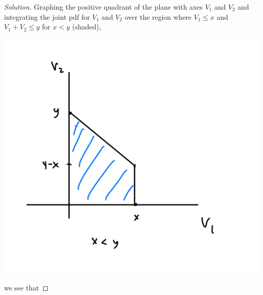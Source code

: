 \documentclass[11pt]{article}
\newenvironment{solution}
  {\renewcommand\qedsymbol{$\blacksquare$}\begin{proof}[Solution]}
  {\end{proof}}
\begin{document}
\begin{enumerate}
\begin{enumerate}[a)]
\begin{solution}
      Graphing the positive quadrant of the plane with axes $V_1$ and $V_2$ and integrating the joint pdf for $V_1$ and $V_2$ over the region where $V_1 \leq x$ and $V_1 + V_2 \leq y$ for $x < y$ (shaded),
      \vspace{-0.5cm}
      \begin{center}  
      \includegraphics[scale = 0.125]{hw4_p1.jpeg}
      \end{center}
      \vspace{-1cm}
      we see that
      

\end{solution}
\end{enumerate}
\end{enumerate}
\end{document}
